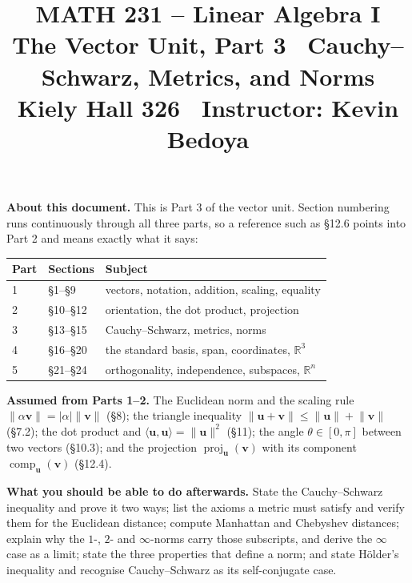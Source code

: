 \documentclass[11pt]{article}
\title{\vspace{-1.2cm}\textbf{\sffamily MATH 231 -- Linear Algebra I}\\[4pt]
       {\large\sffamily The Vector Unit, Part 3 \textbullet\ Cauchy--Schwarz,
        Metrics, and Norms}\\[2pt]
       {\normalsize\sffamily Kiely Hall 326 \textbullet\
        Instructor: Kevin Bedoya}}
\author{}
\date{}
\theoremstyle{definition}
\theoremstyle{remark}
\newcommand{\R}{\mathbb{R}}
\newcommand{\vc}[1]{\mathbf{#1}}
\newcommand{\norm}[1]{\lVert #1\rVert}
\newcommand{\proj}[2]{\operatorname{proj}_{#1}(#2)}
\newcommand{\comp}[2]{\operatorname{comp}_{#1}(#2)}
\begin{document}
\setcounter{section}{12}  %
\maketitle
\vspace{-1.6cm}

\noindent\textbf{About this document.} This is Part 3 of the vector unit.
Section numbering runs continuously through all three parts, so a reference such
as \S12.6 points into Part 2 and means exactly what it says:

\begin{center}
\renewcommand{\arraystretch}{1.2}
\begin{tabular}{@{}l l l@{}}
\toprule
\textbf{Part} & \textbf{Sections} & \textbf{Subject} \\
\midrule
1 & \S1--\S9   & vectors, notation, addition, scaling, equality \\
2 & \S10--\S12 & orientation, the dot product, projection \\
3 & \S13--\S15 & Cauchy--Schwarz, metrics, norms \\
4 & \S16--\S20  & the standard basis, span, coordinates, $\R^{3}$ \\
5 & \S21--\S24  & orthogonality, independence, subspaces, $\R^{n}$ \\
\bottomrule
\end{tabular}
\end{center}

\noindent\textbf{Assumed from Parts 1--2.} The Euclidean norm and the scaling
rule $\norm{\alpha\vc{v}}=\lvert\alpha\rvert\norm{\vc{v}}$ (\S8); the triangle
inequality $\norm{\vc{u}+\vc{v}}\le\norm{\vc{u}}+\norm{\vc{v}}$ (\S7.2); the
dot product and $\langle\vc{u},\vc{u}\rangle=\norm{\vc{u}}^{2}$ (\S11); the
angle $\theta\in[0,\pi]$ between two vectors (\S10.3); and the projection
$\proj{\vc{u}}{\vc{v}}$ with its component $\comp{\vc{u}}{\vc{v}}$ (\S12.4).

\medskip
\noindent\textbf{What you should be able to do afterwards.} State the
Cauchy--Schwarz inequality and prove it two ways; list the axioms a metric must
satisfy and verify them for the Euclidean distance; compute Manhattan and
Chebyshev distances; explain why the $1$-, $2$- and $\infty$-norms carry those
subscripts, and derive the $\infty$ case as a limit; state the three properties
that define a norm; and state H\"older's inequality and recognise
Cauchy--Schwarz as its self-conjugate case.
\end{document}

